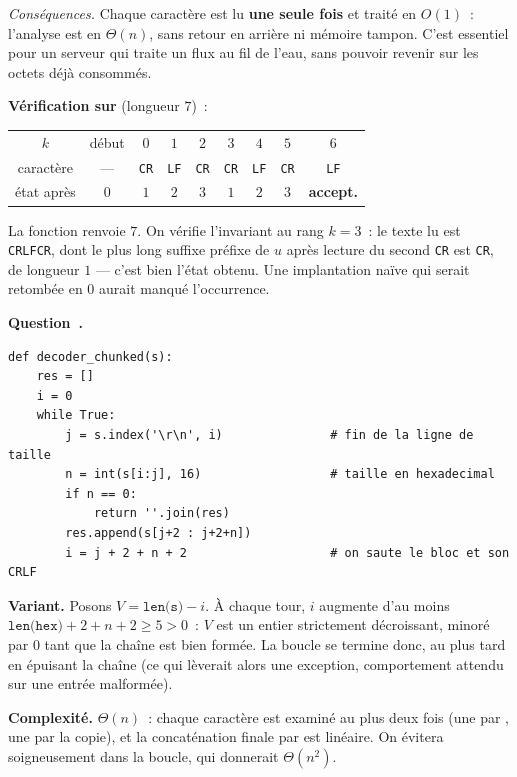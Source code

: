 \documentclass[11pt,a4paper]{article}
\renewcommand{\Q}{\medskip\par\stepcounter{qcnt}\noindent\textbf{\color{cnc}Question~\theqcnt.}~}
\begin{document}
\emph{Conséquences.} Chaque caractère est lu \textbf{une seule fois} et traité en $O(1)$~:
l'analyse est en $\Theta(n)$, sans retour en arrière ni mémoire tampon. C'est essentiel pour
un serveur qui traite un flux au fil de l'eau, sans pouvoir revenir sur les octets déjà
consommés.

\textbf{Vérification sur}  (longueur $7$)~:
\begin{center}\small
\begin{tabular}{c|cccccccc}
$k$ & \multicolumn{1}{c}{début} & $0$ & $1$ & $2$ & $3$ & $4$ & $5$ & $6$\\
caractère & --- & \texttt{CR} & \texttt{LF} & \texttt{CR} & \texttt{CR} & \texttt{LF} &
 \texttt{CR} & \texttt{LF}\\\hline
état après & $0$ & $1$ & $2$ & $3$ & $1$ & $2$ & $3$ & \textbf{accept.}
\end{tabular}
\end{center}
La fonction renvoie $7$. On vérifie l'invariant au rang $k=3$~: le texte lu est
\texttt{CRLFCR}, dont le plus long suffixe préfixe de $u$ après lecture du second \texttt{CR}
est \texttt{CR}, de longueur $1$ — c'est bien l'état obtenu. Une implantation naïve qui
serait retombée en $0$ aurait manqué l'occurrence.

\Q
\begin{lstlisting}
def decoder_chunked(s):
    res = []
    i = 0
    while True:
        j = s.index('\r\n', i)               # fin de la ligne de taille
        n = int(s[i:j], 16)                  # taille en hexadecimal
        if n == 0:
            return ''.join(res)
        res.append(s[j+2 : j+2+n])
        i = j + 2 + n + 2                    # on saute le bloc et son CRLF
\end{lstlisting}
\textbf{Variant.} Posons $V=\texttt{len(s)} - i$. À chaque tour, $i$ augmente d'au moins
$\texttt{len(hex)}+2+n+2\ge 5>0$~: $V$ est un entier strictement décroissant, minoré par $0$
tant que la chaîne est bien formée. La boucle se termine donc, au plus tard en épuisant la
chaîne (ce qui lèverait alors une exception, comportement attendu sur une entrée malformée).

\textbf{Complexité.} $\Theta(n)$~: chaque caractère est examiné au plus deux fois (une par
, une par la copie), et la concaténation finale par  est linéaire.
On évitera soigneusement  dans la boucle, qui donnerait $\Theta(n^2)$.
\end{document}
